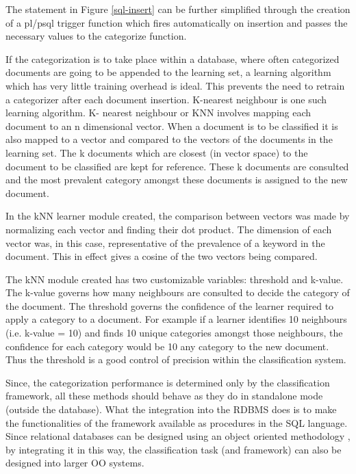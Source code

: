 \documentclass[twocolumn]{article}
\begin{document}
The statement in Figure \ref{sql-insert} can be further simplified through the creation of a pl/psql 
trigger function which fires automatically on insertion and passes the necessary values 
to the categorize function. 

If the categorization is to take place within a database, where often categorized 
documents are going to be appended to the learning set, a learning algorithm which has 
very little training overhead is ideal. This prevents the need to retrain a categorizer 
after each document insertion. K-nearest neighbour is one such learning algorithm. K-
nearest neighbour or KNN involves mapping each document to an n dimensional 
vector. When a document is to be classified it is also mapped to a vector and 
compared to the vectors of the documents in the learning set. The k documents which 
are closest (in vector space) to the document to be classified are kept for reference. 
These k documents are consulted and the most prevalent category amongst these 
documents is assigned to the new document. 

In the kNN learner module created, the comparison between vectors was made by 
normalizing each vector and 
finding their dot product. The dimension of each vector was, in this case, 
representative of the prevalence of a keyword in the document. This in effect gives a 
cosine of the two vectors being compared. 

The kNN module created has two customizable variables: threshold and k-value. The 
k-value governs how many neighbours are consulted to decide the category of the 
document. The threshold governs the confidence of the learner required to apply a 
category to a document. For example if a learner identifies 10 neighbours (i.e. k-value 
= 10) and finds 10 unique categories amongst those neighbours, the confidence for 
each category would be 10%
any category to the new document. Thus the threshold is a good control of precision 
within the classification system.

Since, the categorization performance is determined only by the classification 
framework, all these methods should behave as they do in standalone mode (outside 
the database). What the integration into the RDBMS does is to make the 
functionalities of the framework available as procedures in the SQL language.
Since relational databases can be designed using an object oriented methodology \cite{blaha:88,
rumbaugh:91}, by integrating it in this way, the classification task 
(and framework) can also be designed into larger OO systems.
\end{document}
